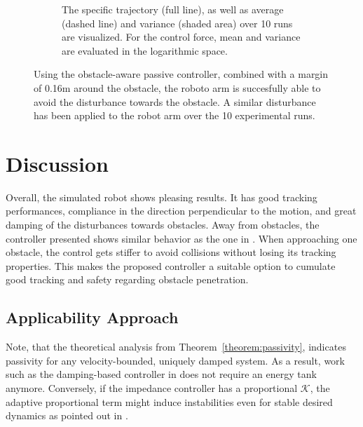 \begin{figure}
\begin{subfigure}{\columnwidth}
      \caption{The specific trajectory (full line), as well as average (dashed line) and variance (shaded area) over 10 runs are visualized. For the control force, mean and variance are evaluated in the logarithmic space.}
      \label{fig:trajectory_comparison_force_and_distance}
    \end{subfigure}
	\caption{Using the obstacle-aware passive controller, combined with a margin of 0.16m around the obstacle, the roboto arm is succesfully able to avoid the disturbance towards the obstacle. A similar disturbance has been applied to the robot arm over the 10 experimental runs. }  
    \label{fig:evaluation_on_robot_arm}
\end{figure}

\section{Discussion}
Overall, the simulated robot shows pleasing results. It has good tracking performances, compliance in the direction perpendicular to the motion, and great damping of the disturbances towards obstacles.
Away from obstacles, the controller presented shows similar behavior as the one in \cite{kronander2015passive}. When approaching one obstacle, the control gets stiffer to avoid collisions without losing its tracking properties. This makes the proposed controller a suitable option to cumulate good tracking and safety regarding obstacle penetration.

\subsection{Applicability Approach}
Note, that the theoretical analysis from Theorem~\ref{theorem:passivity}, indicates passivity for any velocity-bounded, uniquely damped system. As a result, work such as the damping-based controller in  \cite{kronander2015passive} does not require an energy tank anymore.
Conversely, if the impedance controller has a proportional $\mathcal{K}$, the adaptive proportional term might induce instabilities even for stable desired dynamics as pointed out in \cite{ferraguti2013tank, kronander2016stability}.
